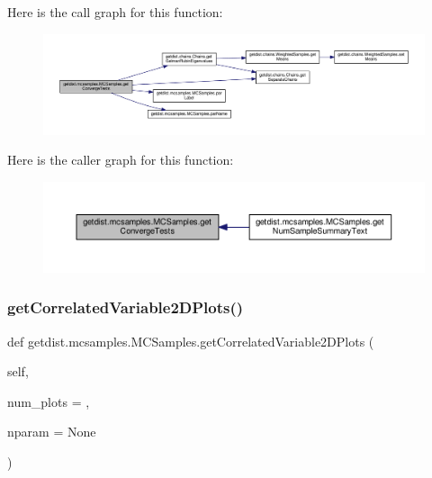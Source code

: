 Here is the call graph for this function\+:
\nopagebreak
\begin{figure}[H]
\begin{center}
\leavevmode
\includegraphics[width=350pt]{classgetdist_1_1mcsamples_1_1MCSamples_afafaf8166588387f41b032b9b8b61c0d_cgraph}
\end{center}
\end{figure}
Here is the caller graph for this function\+:
\nopagebreak
\begin{figure}[H]
\begin{center}
\leavevmode
\includegraphics[width=350pt]{classgetdist_1_1mcsamples_1_1MCSamples_afafaf8166588387f41b032b9b8b61c0d_icgraph}
\end{center}
\end{figure}
\mbox{\label{classgetdist_1_1mcsamples_1_1MCSamples_ab30ef86c7ea5a38b6f4104a5c9055bd8}} 
\subsubsection{\texorpdfstring{get\+Correlated\+Variable2\+D\+Plots()}{getCorrelatedVariable2DPlots()}}
{\footnotesize\ttfamily def getdist.\+mcsamples.\+M\+C\+Samples.\+get\+Correlated\+Variable2\+D\+Plots (\begin{DoxyParamCaption}\item[{}]{self,  }\item[{}]{num\+\_\+plots = {},  }\item[{}]{nparam = {\ttfamily None} }\end{DoxyParamCaption})}

